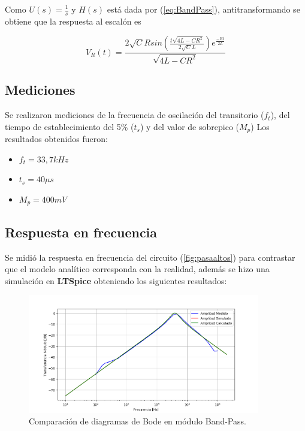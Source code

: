 Como $U(s)=\frac{1}{s}$ y $H(s)$ está dada por (\ref{eq:BandPass}), antitransformando se obtiene que la respuesta al escalón es 

\begin{equation}
    V_R(t)=\frac{2\sqrt{C}Rsin(\frac{t\sqrt{4L-CR^2}}{2\sqrt{C}L})e^{\frac{-Rt}{2L}}}{\sqrt{4L-CR^2}}
\end{equation}

\subsection{Mediciones}
Se realizaron mediciones de la frecuencia de oscilación del transitorio ($f_t$), del tiempo de establecimiento del 5\% ($t_s$) y del valor de sobrepico ($M_p$)
Los resultados obtenidos fueron:

\begin{itemize}
    \item $f_t=33,7 kHz$
    \item $t_s=40\mu s$
    \item $M_p=400 mV$
\end{itemize}

\subsection{Respuesta en frecuencia}
Se midió la respuesta en frecuencia del circuito (\ref{fig:pasaaltos}) para contrastar que el modelo analítico corresponda con la realidad, además se hizo una simulación en \textbf{LTSpice} obteniendo los siguientes resultados:

\begin{figure}[H]
	\centering
	\includegraphics[width=0.9\textwidth]{Bodes_Labo/Fotos/BP.png}
\caption{Comparación de diagramas de Bode en módulo Band-Pass.}
	\label{fig:BODEHP}
\end{figure}

